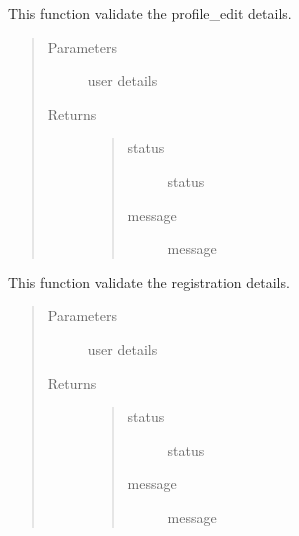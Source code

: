 \documentclass[letterpaper,10pt,english]{sphinxmanual}
\begin{document}

\begin{fulllineitems}
\label{\detokenize{janta:janta.viewhelper.validate_profile_edit}}
This function validate the profile\_edit details.
\begin{quote}\begin{description}
\item[{Parameters}] \leavevmode
{} \textendash{} user details

\item[{Returns}] \leavevmode
\begin{quote}\begin{description}
\item[{status}] \leavevmode
status

\item[{message}] \leavevmode
message

\end{description}\end{quote}


\end{description}\end{quote}

\end{fulllineitems}


\begin{fulllineitems}
\label{\detokenize{janta:janta.viewhelper.validate_registration}}
This function validate the registration details.
\begin{quote}\begin{description}
\item[{Parameters}] \leavevmode
{} \textendash{} user details

\item[{Returns}] \leavevmode
\begin{quote}\begin{description}
\item[{status}] \leavevmode
status

\item[{message}] \leavevmode
message

\end{description}\end{quote}


\end{description}\end{quote}

\end{fulllineitems}
\end{document}
